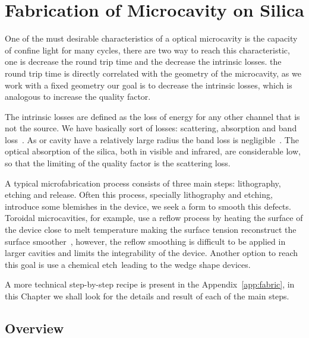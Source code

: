 \chapter{Fabrication of Microcavity on Silica}
\label{chap:fabrication}
One of the must desirable characteristics of a optical microcavity is the capacity of confine light for many cycles, there are two way to reach this characteristic, one is decrease the round trip time and the decrease the intrinsic losses. the round trip time is directly correlated with the geometry of the microcavity, as we work with a fixed geometry our goal is to decrease the intrinsic losses, which is analogous to increase the quality factor. 

The intrinsic losses are defined as the loss of energy for any other channel that is not the source. We have basically sort of losses: scattering, absorption and band loss~\needcit. As or cavity have a relatively large radius the band loss is negligible~\needcit. The optical absorption of the silica, both in visible and infrared, are considerable low, so that the limiting of the quality factor is the scattering loss. 

A typical microfabrication process consists of three main steps: lithography, etching and release. Often this process, specially lithography and etching, introduce some blemishes in the device, we seek a form to smooth this defects.
Toroidal microcavities, for example, use a reflow process by heating the surface of the device close to melt temperature making the surface tension reconstruct the surface smoother~\needcit, however, the reflow smoothing is difficult to be applied in larger cavities and limits the integrability of the device. Another option to reach this goal is use a chemical etch~\needcit leading to the wedge shape devices. 

A more technical step-by-step recipe is present in the Appendix~\ref{app:fabric}, in this Chapter we shall look for the details and result of each of the main steps.

\section{Overview}

